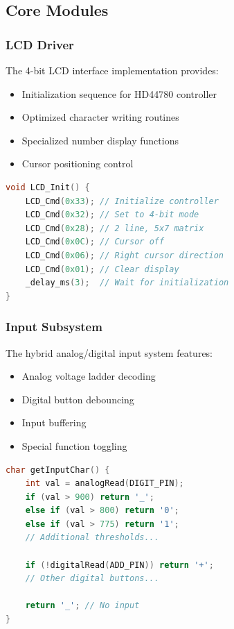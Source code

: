 \documentclass{article}
\begin{document}
\subsection{Core Modules}

\subsubsection{LCD Driver}
The 4-bit LCD interface implementation provides:

\begin{itemize}
\item Initialization sequence for HD44780 controller
\item Optimized character writing routines
\item Specialized number display functions
\item Cursor positioning control
\end{itemize}

\begin{lstlisting}[language=C,caption=LCD Initialization]
void LCD_Init() {
    LCD_Cmd(0x33); // Initialize controller
    LCD_Cmd(0x32); // Set to 4-bit mode
    LCD_Cmd(0x28); // 2 line, 5x7 matrix
    LCD_Cmd(0x0C); // Cursor off
    LCD_Cmd(0x06); // Right cursor direction
    LCD_Cmd(0x01); // Clear display
    _delay_ms(3);  // Wait for initialization
}
\end{lstlisting}

\subsubsection{Input Subsystem}
The hybrid analog/digital input system features:

\begin{itemize}
\item Analog voltage ladder decoding
\item Digital button debouncing
\item Input buffering
\item Special function toggling
\end{itemize}

\begin{lstlisting}[language=C,caption=Input Handling]
char getInputChar() {
    int val = analogRead(DIGIT_PIN);
    if (val > 900) return '_';
    else if (val > 800) return '0';
    else if (val > 775) return '1';
    // Additional thresholds...
    
    if (!digitalRead(ADD_PIN)) return '+';
    // Other digital buttons...
    
    return '_'; // No input
}
\end{lstlisting}
\end{document}
